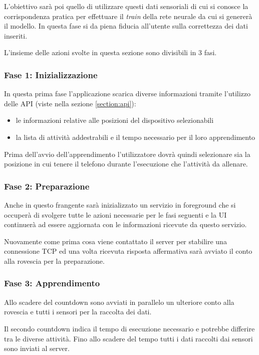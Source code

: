 L'obiettivo sarà poi quello di utilizzare questi dati sensoriali di cui si conosce la corrispondenza pratica per effettuare il \textit{train} 
della rete neurale da cui si genererà il modello. In questa fase si da piena fiducia all'utente sulla correttezza dei dati inseriti.

L'insieme delle azioni svolte in questa sezione sono divisibili in 3 fasi.

\subsubsection{Fase 1: Inizializzazione}
In questa prima fase l'applicazione scarica diverse informazioni tramite l'utilizzo delle API (viste nella sezione \ref{section:api}):
\begin{itemize}
    \item le informazioni relative alle posizioni del dispositivo selezionabili
    \item la lista di attività addestrabili e il tempo necessario per il loro apprendimento
\end{itemize}
Prima dell'avvio dell'apprendimento l'utilizzatore dovrà quindi selezionare sia la posizione in cui tenere il 
telefono durante l'esecuzione che l'attività da allenare.

\subsubsection{Fase 2: Preparazione}
Anche in questo frangente sarà inizializzato un servizio in foreground \cite{services} che si occuperà di svolgere 
tutte le azioni necessarie per le fasi seguenti e la UI continuerà ad essere aggiornata con le informazioni ricevute da questo servizio.

Nuovamente come prima cosa viene contattato il server per stabilire una connessione TCP ed una volta ricevuta risposta affermativa
sarà avviato il conto alla rovescia per la preparazione.

\subsubsection{Fase 3: Apprendimento}
Allo scadere del countdown sono avviati in parallelo un ulteriore conto alla rovescia e tutti i sensori per la raccolta dei dati.

Il secondo countdown indica il tempo di esecuzione necessario e potrebbe differire tra le diverse attività. Fino allo scadere del tempo tutti i dati 
raccolti dai sensori sono inviati al server.

